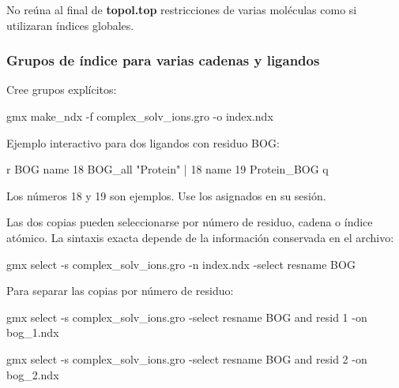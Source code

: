\documentclass[
  spanish,
  11pt,
  a4paper]{article}
\newenvironment{Shaded}{\begin{snugshade}}{\end{snugshade}}
\newcommand{\AttributeTok}[1]{\textcolor[rgb]{0.13,0.29,0.53}{#1}}
\newcommand{\ExtensionTok}[1]{#1}
\newcommand{\NormalTok}[1]{#1}
\newcommand{\StringTok}[1]{\textcolor[rgb]{0.31,0.60,0.02}{#1}}
\begin{document}
No reúna al final de \textbf{topol.top} restricciones de varias
moléculas como si utilizaran índices globales.

\subsubsection{Grupos de índice para varias cadenas y
ligandos}\label{grupos-de-uxedndice-para-varias-cadenas-y-ligandos}

Cree grupos explícitos:

\begin{Shaded}
\begin{Highlighting}[]
\ExtensionTok{gmx}\NormalTok{ make\_ndx     }\AttributeTok{{-}f}\NormalTok{ complex\_solv\_ions.gro     }\AttributeTok{{-}o}\NormalTok{ index.ndx}
\end{Highlighting}
\end{Shaded}

Ejemplo interactivo para dos ligandos con residuo BOG:

\begin{Shaded}
\begin{Highlighting}[]
\NormalTok{r BOG}
\NormalTok{name 18 BOG\_all}
\NormalTok{"Protein" | 18}
\NormalTok{name 19 Protein\_BOG}
\NormalTok{q}
\end{Highlighting}
\end{Shaded}

Los números 18 y 19 son ejemplos. Use los asignados en su sesión.

Las dos copias pueden seleccionarse por número de residuo, cadena o
índice atómico. La sintaxis exacta depende de la información conservada
en el archivo:

\begin{Shaded}
\begin{Highlighting}[]
\ExtensionTok{gmx}\NormalTok{ select     }\AttributeTok{{-}s}\NormalTok{ complex\_solv\_ions.gro     }\AttributeTok{{-}n}\NormalTok{ index.ndx     }\AttributeTok{{-}select} \StringTok{\textquotesingle{}resname BOG\textquotesingle{}}
\end{Highlighting}
\end{Shaded}

Para separar las copias por número de residuo:

\begin{Shaded}
\begin{Highlighting}[]
\ExtensionTok{gmx}\NormalTok{ select     }\AttributeTok{{-}s}\NormalTok{ complex\_solv\_ions.gro     }\AttributeTok{{-}select} \StringTok{\textquotesingle{}resname BOG and resid 1\textquotesingle{}}     \AttributeTok{{-}on}\NormalTok{ bog\_1.ndx}

\ExtensionTok{gmx}\NormalTok{ select     }\AttributeTok{{-}s}\NormalTok{ complex\_solv\_ions.gro     }\AttributeTok{{-}select} \StringTok{\textquotesingle{}resname BOG and resid 2\textquotesingle{}}     \AttributeTok{{-}on}\NormalTok{ bog\_2.ndx}
\end{Highlighting}
\end{Shaded}
\end{document}
